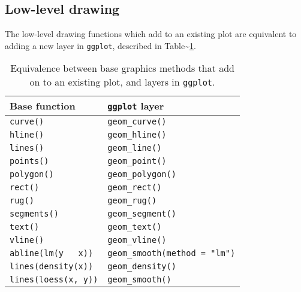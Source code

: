 \subsection{Low-level drawing}

The low-level drawing functions which add to an existing plot are
equivalent to adding a new layer in \texttt{ggplot}, described in
Table\textasciitilde{}\ref{tbl:base-equiv}.

\begin{table}
  \begin{center}
    \begin{tabular}{ll}
      \toprule
      Base function & \texttt{ggplot} layer \\
      \midrule
      \texttt{curve()}    & \texttt{geom_curve()}      \\
      \texttt{hline()}    & \texttt{geom_hline()}      \\
      \texttt{lines()}    & \texttt{geom_line()}       \\
      \texttt{points()}   & \texttt{geom_point()}      \\
      \texttt{polygon()}  & \texttt{geom_polygon()}    \\
      \texttt{rect()}     & \texttt{geom_rect()}       \\
      \texttt{rug()}      & \texttt{geom_rug()}        \\
      \texttt{segments()} & \texttt{geom_segment()}    \\
      \texttt{text()}     & \texttt{geom_text()}       \\
      \texttt{vline()}    & \texttt{geom_vline()}      \\
      \texttt{abline(lm(y ~ x))}  & \texttt{geom_smooth(method = "lm")}  \\
      \texttt{lines(density(x))}  & \texttt{geom_density()}         \\
      \texttt{lines(loess(x, y))} & \texttt{geom_smooth()}          \\
      \bottomrule
    \end{tabular}
  \end{center}
  \caption{Equivalence between base graphics methods that add on to an existing plot, and layers in \texttt{ggplot}.}
  \label{tbl:base-equiv}
\end{table}

\begin{Shaded}
\begin{Highlighting}[]

\StringTok{ }\NormalTok{()}

\NormalTok{() +}\StringTok{ }\NormalTok{()}
\end{Highlighting}
\end{Shaded}

